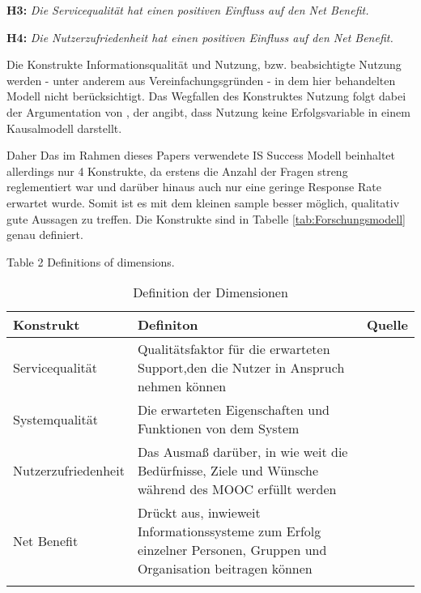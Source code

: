 \textbf{H3:} \textit{Die Servicequalität hat einen positiven Einfluss auf den Net Benefit.} 


\textbf{H4:} \textit{Die Nutzerzufriedenheit hat einen positiven Einfluss auf den Net Benefit.} \medskip


Die Konstrukte Informationsqualität und Nutzung, bzw. beabsichtigte Nutzung werden - unter anderem aus Vereinfachungsgründen - in dem hier behandelten Modell nicht berücksichtigt. Das Wegfallen des Konstruktes Nutzung folgt dabei der Argumentation von \cite{seddon1997respecification}, der angibt, dass Nutzung keine Erfolgsvariable in einem Kausalmodell darstellt. 

Daher 
Das im Rahmen dieses Papers verwendete IS Success Modell beinhaltet allerdings nur 4 Konstrukte, da erstens die Anzahl der Fragen streng reglementiert war und darüber hinaus auch nur eine geringe Response Rate erwartet wurde. Somit ist es mit dem kleinen sample besser möglich, qualitativ gute Aussagen zu treffen. Die Konstrukte sind in Tabelle \ref{tab:Forschungsmodell} genau definiert.


Table 2
Definitions of dimensions.

\begin{table}[ht] 
\footnotesize
\caption{Definition der Dimensionen}
\label{tab:Dimensionen} 
\begin{tabular}{@{}lp{9cm}l@{}} \toprule

\textbf{Konstrukt} & \textbf{Definiton} & \textbf{Quelle} \\ \midrule


Servicequalität 	& Qualitätsfaktor für die erwarteten Support,den die Nutzer in Anspruch nehmen können & \parbox[t]{4cm}{\cite{petter2008measuring}}\\ 

Systemqualität 		& Die erwarteten Eigenschaften und Funktionen von dem System & \parbox[t]{4cm}{\cite{petter2008measuring}}\\ 

Nutzerzufriedenheit & Das Ausmaß darüber, in wie weit die Bedürfnisse, Ziele und Wünsche während des MOOC erfüllt werden & \parbox[t]{4cm}{\cite{sanchez2009moderating}}\\ 

Net Benefit 		& Drückt aus, inwieweit Informationssysteme zum Erfolg einzelner Personen, Gruppen und Organisation beitragen können  & \parbox[t]{4cm}{\cite{conf/gi/GemlikNSB10} \cite{Petter:0aa} }\\ \addlinespace 
  \bottomrule

\end{tabular}	
\end{table}


